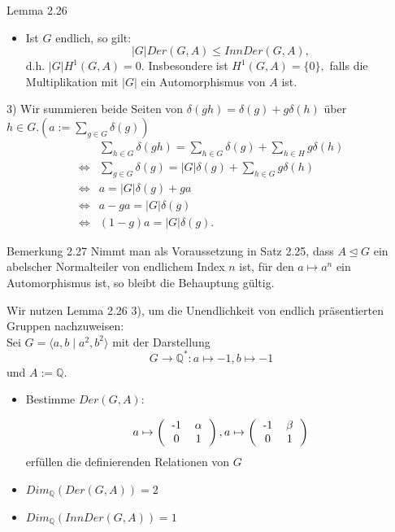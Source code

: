 \documentclass{beamer}
\begin{document}
\begin{frame}
\begin{block}{Lemma 2.26}
\begin{itemize}
\item Ist $G$ endlich, so gilt:
\[
\vert G\vert Der(G,A)\leq InnDer(G,A),
\]
d.h. $\vert G\vert H^1(G,A)=0.$ Insbesondere ist $H^1(G,A)=\{0\},$ falls die Multiplikation mit $\vert G\vert$ ein Automorphismus von $A$ ist.
\end{itemize}
\end{block}
\end{frame}
\begin{frame}
3) Wir summieren beide Seiten von $\delta(gh)=\delta(g)+g\delta(h)$ über $h\in G.({a:=\sum_{g\in G}\delta(g)})$\pause
\begin{align*}
&\sum_{h\in G}\delta(gh)=\sum_{h\in G}\delta(g)+\sum_{h\in H}g\delta(h)\\
{\Leftrightarrow} &\sum_{g\in G}\delta(g)=\vert G \vert\delta(g)+\sum_{h\in G}g\delta(h)\\
\Leftrightarrow & a=\vert G \vert \delta(g) + ga\\
\Leftrightarrow &a-ga=\vert G\vert \delta(g)\\
\Leftrightarrow &(1-g)a=\vert G\vert \delta(g).
\end{align*}
\end{frame}
\begin{frame}
\begin{block}{Bemerkung 2.27}
Nimmt man als Voraussetzung in Satz 2.25, dass $A\trianglelefteq G$ ein abelscher Normalteiler von endlichem Index $n$ ist, für den $a\mapsto a^n$ ein Automorphismus ist, so bleibt die Behauptung gültig.
\end{block}
\end{frame}
\begin{frame}
Wir nutzen Lemma 2.26 3), um die Unendlichkeit von endlich präsentierten Gruppen nachzuweisen:\\\pause
Sei $G=\langle a,b\mid a^2 , b^2 \rangle$ mit der Darstellung \[
G\to \mathbb{Q}^*:a\mapsto -1,b\mapsto -1
\]
 und $A:=\mathbb{Q}.$\pause
 \begin{itemize}
 \item Bestimme $Der(G,A):$\pause
 
 \[
a\mapsto \left( \begin{tabular}{cc}
-1&$\alpha$\\
0&1\\
\end{tabular} \right),
a\mapsto \left( \begin{tabular}{cc}
-1&$\beta$\\
0&1\\
\end{tabular}\right)
 \]
 erfüllen die definierenden Relationen von $G$\pause
 \item $Dim_{\mathbb{Q}}(Der(G,A))=2$ \pause
 \item  $Dim_{\mathbb{Q}}(InnDer(G,A))=1$ 
 \end{itemize}
 \end{frame}
\end{document}
